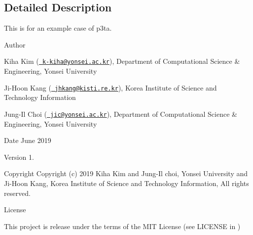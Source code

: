 \subsection{Detailed Description}
This is for an example case of p3ta. 

\begin{DoxyAuthor}{Author}

\end{DoxyAuthor}

\begin{DoxyItemize}
\item Kiha Kim (\href{mailto:k-kiha@yonsei.ac.kr}{\texttt{ k-\/kiha@yonsei.\+ac.\+kr}}), Department of Computational Science \& Engineering, Yonsei University
\item Ji-\/\+Hoon Kang (\href{mailto:jhkang@kisti.re.kr}{\texttt{ jhkang@kisti.\+re.\+kr}}), Korea Institute of Science and Technology Information
\item Jung-\/\+Il Choi (\href{mailto:jic@yonsei.ac.kr}{\texttt{ jic@yonsei.\+ac.\+kr}}), Department of Computational Science \& Engineering, Yonsei University
\end{DoxyItemize}

\begin{DoxyDate}{Date}
June 2019 
\end{DoxyDate}
\begin{DoxyVersion}{Version}
1. 
\end{DoxyVersion}
\begin{DoxyParagraph}{Copyright}
Copyright (c) 2019 Kiha Kim and Jung-\/\+Il choi, Yonsei University and Ji-\/\+Hoon Kang, Korea Institute of Science and Technology Information, All rights reserved. 
\end{DoxyParagraph}
\begin{DoxyParagraph}{License }

\end{DoxyParagraph}
This project is release under the terms of the M\+IT License (see L\+I\+C\+E\+N\+SE in ) 